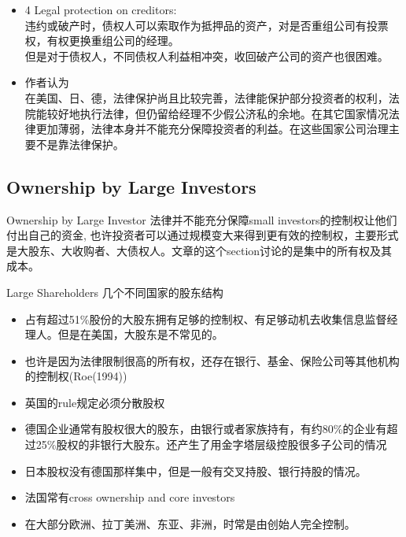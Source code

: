 	\begin{frame}{}
	\begin{itemize}
	\item 4 Legal protection on creditors:\\
	违约或破产时，债权人可以索取作为抵押品的资产，对是否重组公司有投票权，有权更换重组公司的经理。\\
	但是对于债权人，不同债权人利益相冲突，收回破产公司的资产也很困难。
	\item 作者认为\\在美国、日、德，法律保护尚且比较完善，法律能保护部分投资者的权利，法院能较好地执行法律，但仍留给经理不少假公济私的余地。在其它国家情况法律更加薄弱，法律本身并不能充分保障投资者的利益。在这些国家公司治理主要不是靠法律保护。

\end{itemize}
\end{frame}

\subsection[Concentrated Ownership]{Ownership by Large Investors}
	\begin{frame}{Ownership by Large Investor}
	法律并不能充分保障small investors的控制权让他们付出自己的资金, 也许投资者可以通过规模变大来得到更有效的控制权，主要形式是大股东、大收购者、大债权人。文章的这个section讨论的是集中的所有权及其成本。
\end{frame}

	\begin{frame}{Large Shareholders}
	几个不同国家的股东结构
	\begin{itemize}
		\item 占有超过51\%股份的大股东拥有足够的控制权、有足够动机去收集信息监督经理人。但是在美国，大股东是不常见的。
		\item 也许是因为法律限制很高的所有权，还存在银行、基金、保险公司等其他机构的控制权(Roe(1994))
		\item 英国的rule规定必须分散股权
		\item 德国企业通常有股权很大的股东，由银行或者家族持有，有约80\%的企业有超过25\%股权的非银行大股东。还产生了用金字塔层级控股很多子公司的情况
		\item 日本股权没有德国那样集中，但是一般有交叉持股、银行持股的情况。
		\item 法国常有cross ownership and core investors
		\item 在大部分欧洲、拉丁美洲、东亚、非洲，时常是由创始人完全控制。
	\end{itemize}
\end{frame}

